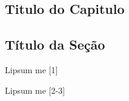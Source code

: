 

\begin{braziltext}

    \chapter{Titulo do Capitulo}

    \begin{flushright}

    \end{flushright}


    \section{Título da Seção}

    Lipsum me [1]

    Lipsum me [2-3]

\end{braziltext}

